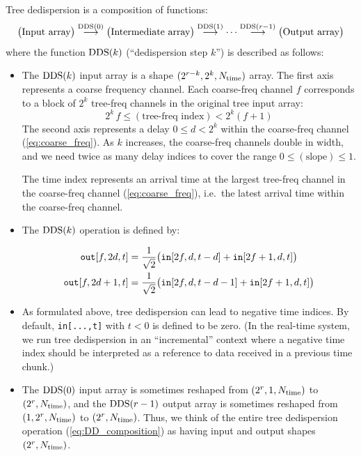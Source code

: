 \documentclass{article}
\numberwithin{equation}{section}   %
\def\DDS{{\rm DDS}}
\def\nn{\nonumber}
\begin{document}
Tree dedispersion is a composition of functions:
\begin{equation}
\big( \mbox{Input array} \big)
  \overset{\DDS(0)}{\longrightarrow} \big( \mbox{Intermediate array} \big)
  \overset{\DDS(1)}{\longrightarrow} \cdots 
  \overset{\DDS(r-1)}{\longrightarrow}
\big( \mbox{Output array} \big)
\label{eq:DD_composition}
\end{equation}
where the function $\DDS(k)$ (``dedispersion step $k$'') is described as follows:

\begin{itemize}

\item
The $\DDS(k)$ input array is a shape $(2^{r-k}, 2^k, N_{\rm time})$ array.
The first axis represents a coarse frequency channel.
Each coarse-freq channel $f$ corresponds to a block of $2^k$ tree-freq channels
in the original tree input array:
\begin{equation}
2^k \, f \le (\mbox{tree-freq index}) < 2^k (f+1)  \label{eq:coarse_freq}
\end{equation}
The second axis represents a delay $0 \le d < 2^k$ within the coarse-freq channel
(\ref{eq:coarse_freq}). As $k$ increases, the coarse-freq channels double in width,
and we need twice as many delay indices to cover the range $0 \le (\mbox{slope}) \le 1$.

The time index represents an arrival time at the largest tree-freq channel
in the coarse-freq channel (\ref{eq:coarse_freq}), i.e.~the latest arrival time within the coarse-freq channel.

\item The $\DDS(k)$ operation is defined by:

\begin{align}
{\tt out}[f,2d,t] &= \frac{1}{\sqrt{2}} 
  \big( {\tt in}[2f,d,t-d] + {\tt in}[2f+1,d,t] \big) \nn \\
{\tt out}[f,2d+1,t] &= \frac{1}{\sqrt{2}} 
  \big( {\tt in}[2f,d,t-d-1] + {\tt in}[2f+1,d,t] \big)
\end{align}

\item
As formulated above, tree dedispersion can lead to negative time indices.
By default, \verb|in[...,t]| with $t<0$ is defined to be zero.
(In the real-time system, we run tree dedispersion in an ``incremental'' context where a negative time index should be interpreted as a reference to data received in a previous time chunk.)

\item The $\DDS(0)$ input array is sometimes reshaped from $(2^r,1,N_{\rm time})$
 to $(2^r,N_{\rm time})$, and the $\DDS(r-1)$ output array is sometimes reshaped
 from $(1,2^r,N_{\rm time})$ to $(2^r,N_{\rm time})$.
 Thus, we think of the entire tree dedispersion operation (\ref{eq:DD_composition}) as having input and output shapes $(2^r, N_{\rm time})$.

\end{itemize}
\end{document}
